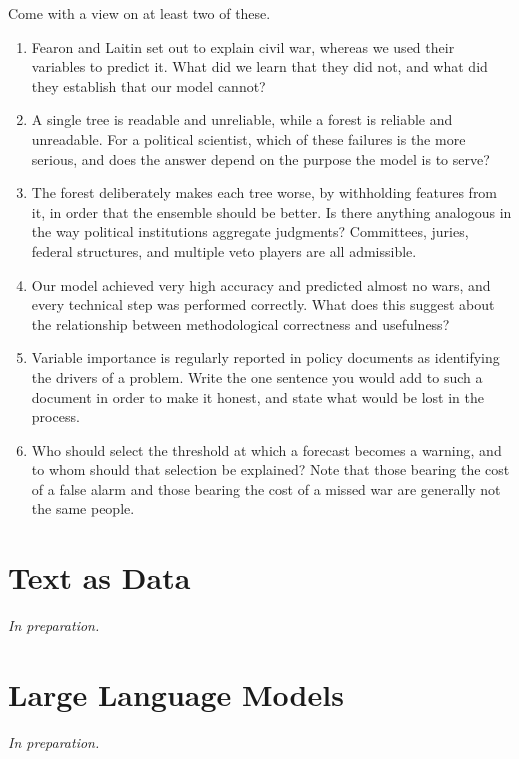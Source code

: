 \documentclass[
  a4paper,
]{scrbook}
\begin{document}
Come with a view on at least two of these.

\begin{enumerate}
\def\labelenumi{\arabic{enumi}.}
\item
  Fearon and Laitin set out to explain civil war, whereas we used their
  variables to predict it. What did we learn that they did not, and what
  did they establish that our model cannot?
\item
  A single tree is readable and unreliable, while a forest is reliable
  and unreadable. For a political scientist, which of these failures is
  the more serious, and does the answer depend on the purpose the model
  is to serve?
\item
  The forest deliberately makes each tree worse, by withholding features
  from it, in order that the ensemble should be better. Is there
  anything analogous in the way political institutions aggregate
  judgments? Committees, juries, federal structures, and multiple veto
  players are all admissible.
\item
  Our model achieved very high accuracy and predicted almost no wars,
  and every technical step was performed correctly. What does this
  suggest about the relationship between methodological correctness and
  usefulness?
\item
  Variable importance is regularly reported in policy documents as
  identifying the drivers of a problem. Write the one sentence you would
  add to such a document in order to make it honest, and state what
  would be lost in the process.
\item
  Who should select the threshold at which a forecast becomes a warning,
  and to whom should that selection be explained? Note that those
  bearing the cost of a false alarm and those bearing the cost of a
  missed war are generally not the same people.
\end{enumerate}

\chapter{Text as Data}\label{text-as-data}

\emph{In preparation.}

\chapter{Large Language Models}\label{large-language-models}

\emph{In preparation.}
\end{document}
